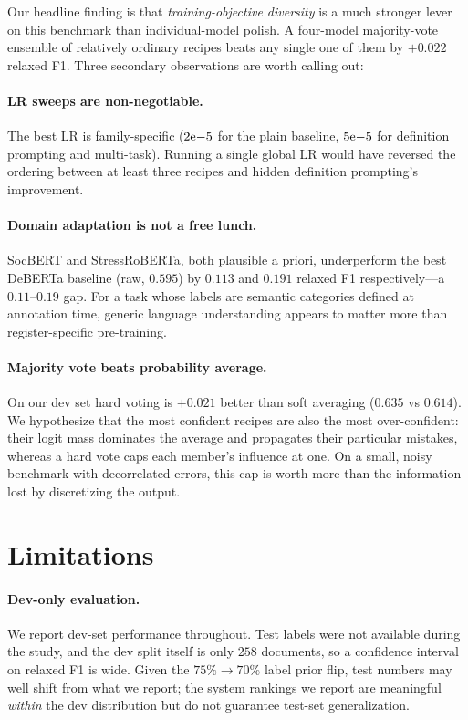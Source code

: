 \documentclass[11pt]{article}
\begin{document}
Our headline finding is that \emph{training-objective diversity} is a
much stronger lever on this benchmark than individual-model polish. A
four-model majority-vote ensemble of relatively ordinary recipes beats
any single one of them by $+0.022$ relaxed F1. Three secondary
observations are worth calling out:

\paragraph{LR sweeps are non-negotiable.} The best LR is family-specific
($2{\rm e}{-5}$ for the plain baseline, $5{\rm e}{-5}$ for definition
prompting and multi-task). Running a single global LR would have
reversed the ordering between at least three recipes and hidden
definition prompting's improvement.

\paragraph{Domain adaptation is not a free lunch.} SocBERT and StressRoBERTa, both plausible a priori, underperform the best DeBERTa baseline (raw, $0.595$) by $0.113$ and $0.191$ relaxed F1 respectively---a $0.11$--$0.19$ gap. For a task whose labels are semantic categories defined at annotation time, generic language understanding appears to matter more than register-specific pre-training.

\paragraph{Majority vote beats probability average.} On our dev set hard voting is $+0.021$ better than soft averaging ($0.635$ vs $0.614$). We hypothesize that the most confident recipes are also the most over-confident: their logit mass dominates the average and propagates their particular mistakes, whereas a hard vote caps each member's influence at one. On a small, noisy benchmark with decorrelated errors, this cap is worth more than the information lost by discretizing the output.

\section{Limitations}
\label{sec:limit}

\paragraph{Dev-only evaluation.} We report dev-set performance
throughout. Test labels were not available during the study, and the
dev split itself is only $258$ documents, so a confidence interval on
relaxed F1 is wide. Given the $75\%\to 70\%$ label prior flip, test
numbers may well shift from what we report; the system rankings we
report are meaningful \emph{within} the dev distribution but do not
guarantee test-set generalization.
\end{document}
